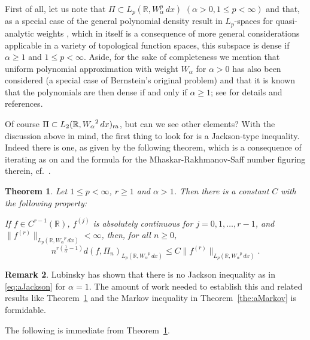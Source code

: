 \documentclass[12pt, reqno]{amsart}
\numberwithin{equation}{section}
\theoremstyle{plain}
\newtheorem{theorem}{Theorem}[section]
\theoremstyle{definition}
\newtheorem{remark}[theorem]{Remark}
\begin{document}
First of all, let us note that $\Pi\subset L_p({{\mathbb R}},W_\alpha^p\,dx)$ $(\alpha>0, 1\leq p<\infty)$ and that, as a special case of the general polynomial density result in $L_p$-spaces for quasi-analytic weights \cite[Corollary~6.34]{Jeu}, which in itself is a consequence of more general considerations applicable in a variety of topological function spaces, this subspace is dense if $\alpha\geq 1$ and $1\leq p<\infty$. Aside, for the sake of completeness we mention that uniform polynomial approximation with weight ${W_\alpha}$ for $\alpha>0$ has also been considered (a special case of Bernstein's original problem) and that it is known that the polynomials are then dense if and only if $\alpha\geq 1$; see \cite[p.~254]{Lu1} for details and references.

Of course $\Pi\subset{L_2({{\mathbb R}},{W_\alpha}^2\,dx)_{\textup{ra}}}$, but can we see other elements? With the discussion above in mind, the first thing to look for is a Jackson-type inequality. Indeed there is one, as given by the following theorem, which is a consequence of iterating \cite[Corollary~3.2]{Lu} as on \cite[p.~12-13]{Lu} and the formula for the Mhaskar-Rakhmanov-Saff number figuring therein, cf.~\cite[p.~11]{Lu}.

\begin{theorem}\label{the:aJackson}
Let $1\leq p<\infty$, $r\geq 1$ and $\alpha>1$. Then there is a constant $C$ with the following property:

If $f\in C^{r-1}({{\mathbb R}})$, $f^{(j)}$ is absolutely continuous for $j=0,1,\ldots, r-1$, and $\|f^{(r)}\|_{{L_p({{\mathbb R}}, {W_\alpha}^p\,dx)}}<\infty$, then, for all $n\geq 0$,
\begin{equation}\label{eq:aJackson}
 n^{r\left(\frac{1} {\alpha}-1\right)} d(f,\Pi_n)_{{L_p({{\mathbb R}}, {W_\alpha}^p\,dx)}}\leq C\| f^{(r)}\|_{{L_p({{\mathbb R}}, {W_\alpha}^p\,dx)}}.
\end{equation}
\end{theorem}

\begin{remark}
Lubinsky has shown \cite[p.~255]{Lu1} that there is no Jackson inequality as in \eqref{eq:aJackson} for $\alpha=1$. The amount of work needed to establish this and related results like Theorem~\ref{the:aJackson} and the Markov inequality in Theorem~\ref{the:aMarkov} is formidable.
\end{remark}

The following is immediate from Theorem~\ref{the:aJackson}.
\end{document}
